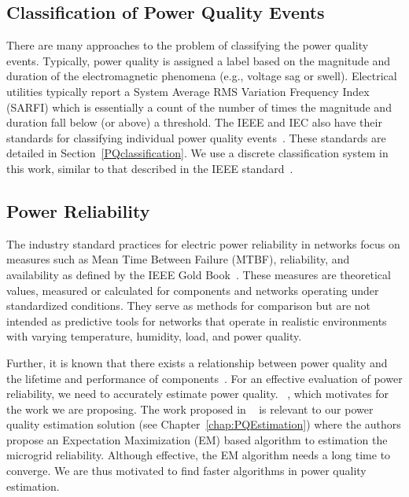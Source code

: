 \subsection{Classification of Power Quality Events}
There are many approaches to the problem of classifying the power quality events. Typically, power quality is assigned a label based on the magnitude and duration of the electromagnetic phenomena (e.g., voltage sag or swell). Electrical utilities typically report a System Average RMS Variation Frequency Index (SARFI) which is essentially a count of the number of times the magnitude and duration fall below (or above) a threshold. The IEEE and IEC also have their standards for classifying individual power quality events~\cite{iec_61000, IEEE09_1159}. These standards are detailed in Section~\ref{PQclassification}. We use a discrete classification system in this work, similar to that described in the IEEE standard~\cite{IEEE09_1159}.


\subsection{Power Reliability}
The industry standard practices for electric power reliability in networks focus on measures such as Mean Time Between Failure (MTBF), reliability, and availability as defined by the IEEE Gold Book~\cite{goldbook}. These measures are theoretical values, measured or calculated for components and networks operating under standardized conditions. They serve as methods for comparison but are not intended as predictive tools for networks that operate in realistic environments with varying temperature, humidity, load, and power quality.

Further, it is known that there exists a relationship between power quality and the lifetime and performance of components~\cite{iti_curve}. For an effective evaluation of power reliability, we need to accurately estimate power quality. ~\cite{catherine_pri}, which motivates for the work we are proposing. The work proposed in ~\cite{catherine_pri} is relevant to our power quality estimation solution (see Chapter~\ref{chap:PQEstimation}) where the authors propose an Expectation Maximization (EM) based algorithm to estimation the microgrid reliability. Although effective, the EM algorithm needs a long time to converge. We are thus motivated to find faster algorithms in power quality estimation.

